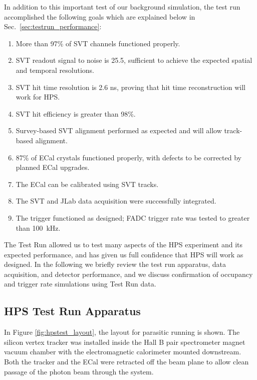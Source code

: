 In addition to this important test of our background simulation, the test run accomplished the following goals which are explained below in Sec.~\ref{sec:testrun_performance}:
\begin{enumerate}
	\item More than 97\% of SVT channels functioned properly.
	\item SVT readout signal to noise is 25.5, sufficient to achieve the expected spatial and temporal resolutions.
	\item SVT hit time resolution is 2.6 ns, proving that hit time reconstruction will work for HPS.
	\item SVT hit efficiency is greater than 98\%.
	\item Survey-based SVT alignment performed as expected and will allow track-based alignment.
	\item 87\% of ECal crystals functioned properly, with defects to be corrected by planned ECal upgrades.
	\item The ECal can be calibrated using SVT tracks.
	\item The SVT and JLab data acquisition were successfully integrated.
	\item The trigger functioned as designed; FADC trigger rate was tested to greater than 100~kHz.
\end{enumerate}

The Test Run allowed us to test many aspects of the HPS experiment and its expected performance, and has given us full confidence that HPS will work as designed. In the following we briefly review the test run apparatus, data acquisition, and detector performance, and we discuss confirmation of occupancy and trigger rate simulations using Test Run data.

\subsection{HPS Test Run Apparatus } 

In Figure \ref{fig:hpstest_layout}, the layout for parasitic running is shown. The silicon vertex tracker was installed inside the Hall B pair spectrometer magnet vacuum chamber with the electromagnetic calorimeter mounted downstream.
Both the tracker and the ECal were retracted off the beam plane to allow clean passage of the photon beam through the system.
 
